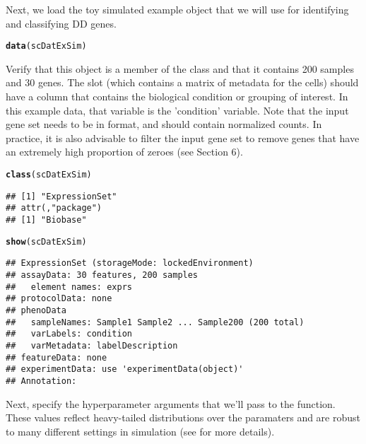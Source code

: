 \documentclass{article}\usepackage[]{graphicx}\usepackage[]{color}
\makeatletter
\newcommand{\hlstd}[1]{\textcolor[rgb]{0.345,0.345,0.345}{#1}}%
\newcommand{\hlkwd}[1]{\textcolor[rgb]{0.737,0.353,0.396}{\textbf{#1}}}%
\newenvironment{kframe}{%
 \def\at@end@of@kframe{}%
 \ifinner\ifhmode%
  \def\at@end@of@kframe{\end{minipage}}%
  \begin{minipage}{\columnwidth}%
 \fi\fi%
 \def\FrameCommand##1{\hskip\@totalleftmargin \hskip-\fboxsep
 \colorbox{shadecolor}{##1}\hskip-\fboxsep
     \hskip-\linewidth \hskip-\@totalleftmargin \hskip\columnwidth}%
 \MakeFramed {\advance\hsize-\width
   \@totalleftmargin\z@ \linewidth\hsize
   \@setminipage}}%
 {\par\unskip\endMakeFramed%
 \at@end@of@kframe}
\newenvironment{knitrout}{}{} %
\makeatother
\begin{document}
Next, we load the toy simulated example  object that we will use for identifying and classifying DD genes.
\begin{knitrout}
\color{fgcolor}\begin{kframe}
\begin{alltt}
\hlkwd{data}\hlstd{(scDatExSim)}
\end{alltt}
\end{kframe}
\end{knitrout}

Verify that this object is a member of the  class and that it contains 200 samples and 30 genes.  The  slot (which contains a matrix of metadata for the cells) should have a column that contains the biological condition or grouping of interest.  In this example data, that variable is the 'condition' variable.  Note that the input gene set needs to be in  format, and should contain normalized counts.  In practice, it is also advisable to filter the input gene set to remove genes that have an extremely high proportion of zeroes (see Section 6). 
\begin{knitrout}
\color{fgcolor}\begin{kframe}
\begin{alltt}
\hlkwd{class}\hlstd{(scDatExSim)}
\end{alltt}
\begin{verbatim}
## [1] "ExpressionSet"
## attr(,"package")
## [1] "Biobase"
\end{verbatim}
\begin{alltt}
\hlkwd{show}\hlstd{(scDatExSim)}
\end{alltt}
\begin{verbatim}
## ExpressionSet (storageMode: lockedEnvironment)
## assayData: 30 features, 200 samples 
##   element names: exprs 
## protocolData: none
## phenoData
##   sampleNames: Sample1 Sample2 ... Sample200 (200 total)
##   varLabels: condition
##   varMetadata: labelDescription
## featureData: none
## experimentData: use 'experimentData(object)'
## Annotation:
\end{verbatim}
\end{kframe}
\end{knitrout}

Next, specify the hyperparameter arguments that we'll pass to the  function.  These values reflect heavy-tailed distributions over the paramaters and are robust to many different settings in simulation (see \cite{korthauer2015} for more details).
\end{document}
